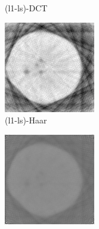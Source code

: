 \documentclass[journal]{IEEEtran}
\begin{document}
\begin{figure}[!h]
\begin{subfigure}[b]{0.24\linewidth}
        \caption{(l1-ls)-DCT}
     \end{subfigure}
    \begin{subfigure}[b]{0.24\linewidth}
        \includegraphics[width=\textwidth]{../images/potato/post_tci/comparison/cs_wavelet.png}
        \caption{(l1-ls)-Haar}
     \end{subfigure}
    \begin{subfigure}[b]{0.24\linewidth}
        \includegraphics[width=\textwidth]{../images/potato/post_tci/comparison/art.png}

\end{subfigure}
\end{figure}
\end{document}

